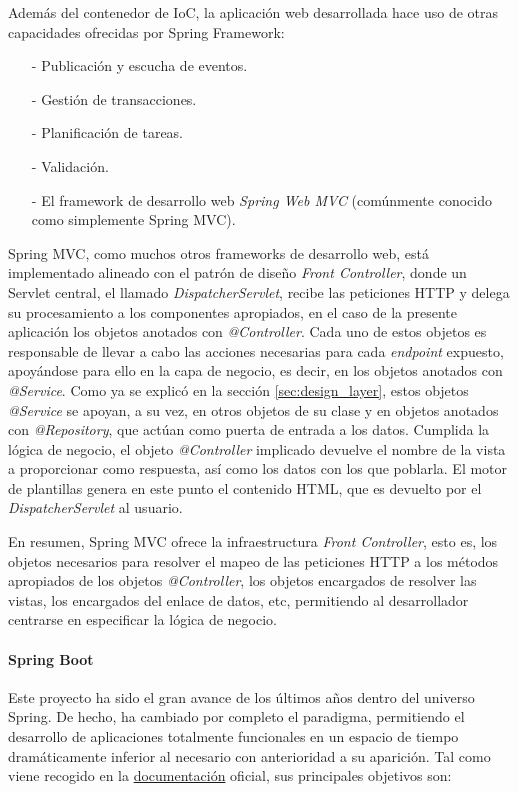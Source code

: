 \documentclass[a4paper]{article}
\begin{document}
    Además del contenedor de IoC, la aplicación web desarrollada hace uso de otras capacidades ofrecidas por Spring Framework:
    
    \begin{itemize}
    	\item[-] Publicación y escucha de eventos.
    	\item[-] Gestión de transacciones.
    	\item[-] Planificación de tareas.
    	\item[-] Validación.
    	\item[-] El framework de desarrollo web \emph{Spring Web MVC} (comúnmente conocido como simplemente Spring MVC).
    \end{itemize}
    
    Spring MVC, como muchos otros frameworks de desarrollo web, está implementado alineado con el patrón de diseño \emph{Front Controller}, donde un Servlet central, el llamado \emph{DispatcherServlet}, recibe las peticiones HTTP y delega su procesamiento a los componentes apropiados, en el caso de la presente aplicación los objetos anotados con \emph{@Controller}. Cada uno de estos objetos es responsable de llevar a cabo las acciones necesarias para cada \emph{endpoint} expuesto, apoyándose para ello en la capa de negocio, es decir, en los objetos anotados con \emph{@Service}. Como ya se explicó en la sección \ref{sec:design_layer}, estos objetos \emph{@Service} se apoyan, a su vez, en otros objetos de su clase y en objetos anotados con \emph{@Repository}, que actúan como puerta de entrada a los datos. Cumplida la lógica de negocio, el objeto \emph{@Controller} implicado devuelve el nombre de la vista a proporcionar como respuesta, así como los datos con los que poblarla. El motor de plantillas genera en este punto el contenido HTML, que es devuelto por el \emph{DispatcherServlet} al usuario.
    
    En resumen, Spring MVC ofrece la infraestructura \emph{Front Controller}, esto es, los objetos necesarios para resolver el mapeo de las peticiones HTTP a los métodos apropiados de los objetos \emph{@Controller}, los objetos encargados de resolver las vistas, los encargados del enlace de datos, etc, permitiendo al desarrollador centrarse en especificar la lógica de negocio.
    
    \paragraph{Spring Boot}
    Este proyecto ha sido el gran avance de los últimos años dentro del universo Spring. De hecho, ha cambiado por completo el paradigma, permitiendo el desarrollo de aplicaciones totalmente funcionales en un espacio de tiempo dramáticamente inferior al necesario con anterioridad a su aparición. Tal como viene recogido en la \href{https://docs.spring.io/spring-boot/docs/current-SNAPSHOT/reference/html/}{documentación} oficial, sus principales objetivos son:
    
\end{document}
